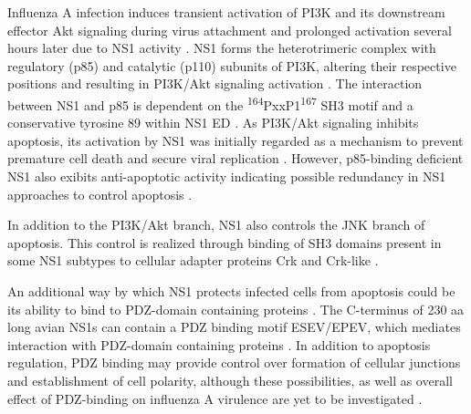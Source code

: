		Influenza A infection induces transient activation of \gls{PI3K} and its downstream effector Akt signaling during virus attachment and prolonged activation several hours later due to \gls{NS1} activity \parencite{Ehrhardt2006, Ehrhardt2009}. \gls{NS1} forms the heterotrimeric complex with regulatory (p85) and catalytic (p110) subunits of \gls{PI3K}, altering their respective positions and resulting in \gls{PI3K}/Akt signaling activation \parencite{Hale2008d, Hale2010c}. The interaction between \gls{NS1} and p85 is dependent on the \textsuperscript{164}PxxP1\textsuperscript{167} \gls{SH3} motif and a conservative tyrosine 89 within \gls{NS1} \gls{ED} \parencite{Hale2006, Shin2007a, Shin2007}. As \gls{PI3K}/Akt signaling inhibits apoptosis, its activation by \gls{NS1} was initially regarded as a mechanism to prevent premature cell death and secure viral replication \parencite{Ehrhardt2007, Zhirnov2007}. However, p85-binding deficient \gls{NS1} also exibits anti-apoptotic activity indicating possible redundancy in NS1 approaches to control apoptosis \parencite{Jackson2010a}.
		
		In addition to the \gls{PI3K}/Akt branch, \gls{NS1} also controls the \gls{JNK} branch of apoptosis. This control is realized through binding of \gls{SH3} domains present in some \gls{NS1} subtypes to cellular adapter proteins Crk and Crk-like \parencite{Heikkinen2008, Hrincius2010}.
		
		An additional way by which \gls{NS1} protects infected cells from apoptosis could be its ability to bind to PDZ-domain containing proteins \parencite{Liu2010}. The C-terminus of 230 \gls{aa} long avian \gls{NS1}s can contain a PDZ binding motif ESEV/EPEV, which mediates interaction with PDZ-domain containing proteins \parencite{Golebiewski2011}. In addition to apoptosis regulation, PDZ binding may provide control over formation of cellular junctions and establishment of cell polarity, although these possibilities, as well as overall effect of PDZ-binding on influenza A virulence are yet to be investigated \parencite{Jackson2010, Zielecki2010, Javier2011}.
		
		
		
		
				
	
		
